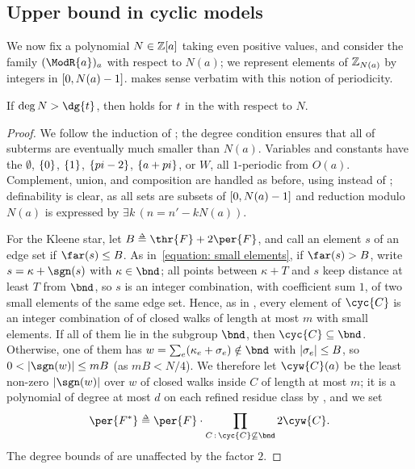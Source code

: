 \subsection{Upper bound in cyclic models}
\AP We now fix a polynomial $N \in \mathbb{Z}[a]$ taking even positive values, and consider the family $(\ModR{a})_a$ with respect to $N(a)$; we represent elements of $\mathbb{Z}_{N(a)}$ by integers in $[0, N(a) - 1]$.
 makes sense verbatim with this notion of periodicity.
\begin{proposition}\label{proposition: upper bound cyclic}
    If $\deg N > \dg{\term}$, then  holds for $\term$ in the  with respect to $N$.
\end{proposition}
\begin{proof}
    We follow the induction of ; the degree condition ensures that all  of subterms are eventually much smaller than $N(a)$.
    Variables and constants have the  $\emptyset$, $\{0\}$, $\{1\}$, $\{p i - 2\}$, $\{a + p i\}$, or $W$, all $1$-periodic from $O(a)$.
    Complement, union, and composition are handled as before, using  instead of ; definability is clear, as all sets are subsets of $[0, N(a) - 1]$ and reduction modulo $N(a)$ is expressed by $\exists k\,(n = n' - k N(a))$.

    For the Kleene star, let $B \defeq \thr{F} + 2 \per{F}$, and call an element $s$ of an edge set  if $\far(s) \le B$.
    As in~\eqref{equation: small elements}, if $\far(s) > B$, write $s = \kappa + \sgn(s)$ with $\kappa \in \bnd$; all points between $\kappa + T$ and $s$ keep distance at least $T$ from $\bnd$, so $s$ is an integer combination, with coefficient sum $1$, of two small elements of the same edge set.
    Hence, as in , every element of $\cyc{C}$ is an integer combination of  of closed walks of length at most $m$ with small elements.
    If all of them lie in the subgroup $\bnd$, then $\cyc{C} \subseteq \bnd$.
    Otherwise, one of them has  $w = \sum_e (\kappa_e + \sigma_e) \notin \bnd$ with $\lvert\sigma_e\rvert \le B$, so $0 < \abs{\sgn(w)} \le m B$ (as $m B < N/4$).
    We therefore let $\cyw{C}(a)$ be the least non-zero $\abs{\sgn(w)}$ over  $w$ of closed walks inside $C$ of length at most $m$; it is a polynomial of degree at most $d$ on each refined residue class by , and we set
    \[\per{F^{*}} \defeq \per{F} \cdot \prod_{C \,:\, \cyc{C} \not\subseteq \bnd} 2 \cyw{C}.\]
    The degree bounds of  are unaffected by the factor $2$.


\end{proof}
